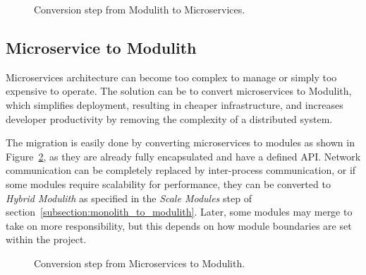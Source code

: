 \begin{figure}
    \centering
    
    \caption{Conversion step from Modulith to Microservices.\label{fig:modulith_to_microservices_steps}}
\end{figure}


\subsection{Microservice to Modulith}
Microservices architecture can become too complex to manage or simply too expensive to operate. The solution can be to convert microservices to Modulith, which simplifies deployment, resulting in cheaper infrastructure, and increases developer productivity by removing the complexity of a distributed system.

The migration is easily done by converting microservices to modules as shown in Figure~\ref{fig:microservices_to_modulith_steps}, as they are already fully encapsulated and have a defined API. Network communication can be completely replaced by inter-process communication, or if some modules require scalability for performance, they can be converted to \textit{Hybrid Modulith} as specified in the \textit{Scale Modules} step of section~\ref{subsection:monolith_to_modulith}. Later, some modules may merge to take on more responsibility, but this depends on how module boundaries are set within the project.

\begin{figure}
    \centering
    
    \caption{Conversion step from Microservices to Modulith.\label{fig:microservices_to_modulith_steps}}
\end{figure}





